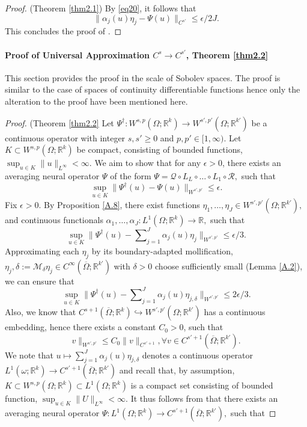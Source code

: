 \documentclass[reqno]{amsart}
\theoremstyle{plain}
\theoremstyle{definition}
\newcommand{\bb}[1]{\mathbb{#1}}
\newcommand{\cal}[1]{\mathcal{#1}}
\begin{document}
\begin{proof}{(Theorem \ref{thm2.1})}
\noindent By \ref{eq20}, it follows that 
$$ \|\alpha_j(u)\eta_j - \Psi(u)\|_{C^{s'}} \leq \epsilon/2J.$$
This concludes the proof of .
\end{proof}

\paragraph{\bf Proof of Universal Approximation $C^s \to C^{s'}$, Theorem \ref{thm2.2}}
This section provides the proof in the scale of Sobolev spaces. The proof is similar to the case of spaces of continuity differentiable functions hence only the alteration to the proof have been mentioned here.
\begin{proof}(Theorem \ref{thm2.2}
    Let $\Psi^\dag : W^{s,p}(\Omega;\bb R^k) \to W^{s',p'}(\Omega;\bb R^{k'})$ be a continuous operator with integer $s,s' \geq 0$ and $p, p' \in [1,\infty)$. Let $K \subset W^{s,p}(\Omega;\bb R^k)$ be compact, consisting of bounded functions, $\sup_{u\in K}\|u\|_{L^\infty} < \infty.$ We aim to show that for any $\epsilon> 0$, there exists an averaging neural operator $\Psi$ of the form $\Psi = \cal Q \circ L_L \circ \dots \circ L_1 \circ\cal R,$ such that 
    $$ \sup_{u\in K}\|\Psi^\dag(u) - \Psi(u)\|_{W^{s',p'}} \leq \epsilon.$$
    Fix $\epsilon > 0$. By Proposition \ref{A.8}, there exist functions $\eta_1, \dots, \eta_J \in W^{s',p'}(\Omega;\bb R^{k'}),$ and continuous functionals $\alpha_1, \dots, \alpha_J : L^1(\Omega;\bb R^k) \to \bb R,$ such that
    $$ \sup_{u\in K}\|\Psi^\dag(u) - \sum\nolimits_{j=1}^{J}\alpha_j(u)\eta_j\|_{W^{s',p'}} \leq \epsilon/3.$$
    Approximating each $\eta_j$ by its boundary-adapted mollification, $\eta_j,\delta := \cal M_{\delta}\eta_j \in C^\infty(\overline{\Omega};\bb R^{k'})$ with $\delta > 0$ choose sufficiently small (Lemma \ref{A.2}), we can ensure that
    $$\sup_{u\in K}\|\Psi^\dag(u) - \sum\nolimits_{j=1}^{J}\alpha_j(u)\eta_{j,\delta}\|_{W^{s',p'}} \leq 2\epsilon/3.$$
    Also, we know that $C^{s+1}(\overline{\Omega};\bb R^k) \hookrightarrow W^{s',p'}(\Omega;\bb R^{k'})$ has a continuous embedding, hence there exists a constant $C_0 > 0$, such that
    \begin{equation}
        v\|_{W^{s',p'}} \leq C_0\|v\|_{C^{s'+1}}, \forall v\in C^{s'+1}(\overline{\Omega};\bb R^{k'}).
\end{equation}
We note that $u \mapsto \sum_{j=1}^{J}\alpha_j(u)\eta_{j,\delta}$ denotes a continuous operator $L^1(\omega;\bb R^k) \to C^{s'+1}(\overline{\Omega};\bb R^{k'})$ and recall that, by assumption, $K \subset W^{s,p}(\Omega;\bb R^k) \subset L^1(\Omega;\bb R^k)$ is a compact set consisting of bounded function, $\sup_{u\in K}\|U\|_{L^\infty} < \infty$. It thus follows from  that there exists an averaging neural operator $\Psi:L^1(\Omega;\bb R^k) \to C^{s'+1}(\overline{\Omega};\bb R^{k'}),$ such that 

\end{proof}
\end{document}
